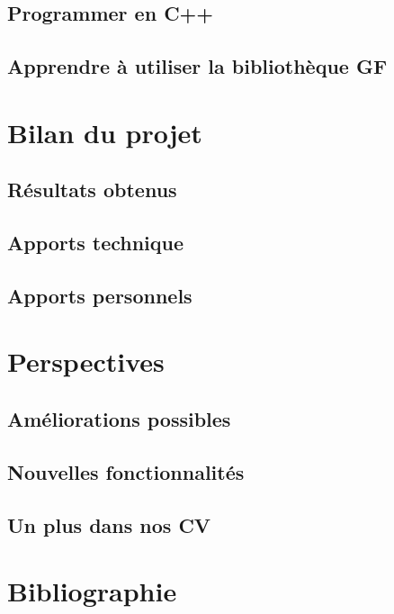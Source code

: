 \documentclass[12pt]{report}
\begin{document}
\subsection{Programmer en C++}
\subsection{Apprendre à utiliser la bibliothèque GF}

\section{Bilan du projet}
\subsection{Résultats obtenus}
\subsection{Apports technique}
\subsection{Apports personnels}

\section{Perspectives}
\subsection{Améliorations possibles}
\subsection{Nouvelles fonctionnalités}
\subsection{Un plus dans nos CV}

\section{Bibliographie}
\end{document}
